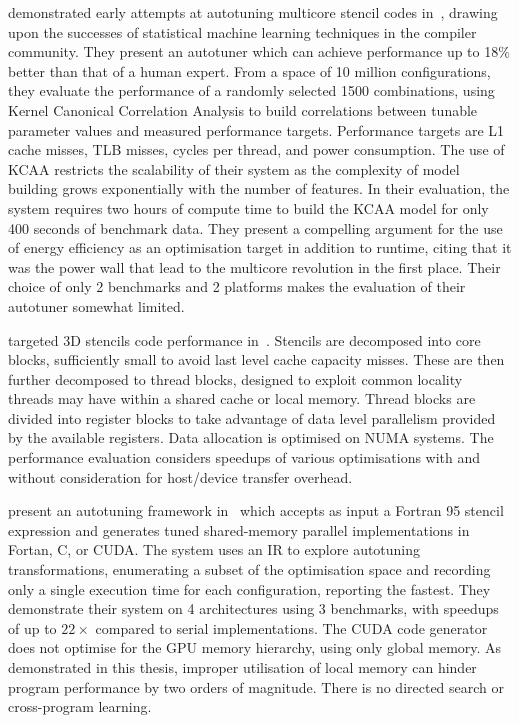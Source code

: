 \citeauthor{Ganapathi2009} demonstrated early attempts at autotuning multicore stencil codes in~\cite{Ganapathi2009}, drawing upon the successes of statistical machine learning techniques in the compiler community. They present an autotuner which can achieve performance up to 18\% better than that of a human expert. From a space of 10 million configurations, they evaluate the performance of a randomly selected 1500 combinations, using Kernel Canonical Correlation Analysis to build correlations between tunable parameter values and measured performance targets. Performance targets are L1 cache misses, TLB misses, cycles per thread, and power consumption. The use of KCAA restricts the scalability of their system as the complexity of model building grows exponentially with the number of features. In their evaluation, the system requires two hours of compute time to build the KCAA model for only 400 seconds of benchmark data. They present a compelling argument for the use of energy efficiency as an optimisation target in addition to runtime, citing that it was the power wall that lead to the multicore revolution in the first place. Their choice of only 2 benchmarks and 2 platforms makes the evaluation of their autotuner somewhat limited.

\citeauthor{Berkeley2009} targeted 3D stencils code performance in~\cite{Berkeley2009}. Stencils are decomposed into core blocks, sufficiently small to avoid last level cache capacity misses. These are then further decomposed to thread blocks, designed to exploit common locality threads may have within a shared cache or local memory. Thread blocks are divided into register blocks to take advantage of data level parallelism provided by the available registers. Data allocation is optimised on NUMA systems. The performance evaluation considers speedups of various optimisations with and without consideration for host/device transfer overhead.

\citeauthor{Kamil2010} present an autotuning framework in~\cite{Kamil2010} which accepts as input a Fortran 95 stencil expression and generates tuned shared-memory parallel implementations in Fortan, C, or CUDA. The system uses an IR to explore autotuning transformations, enumerating a subset of the optimisation space and recording only a single execution time for each configuration, reporting the fastest. They demonstrate their system on 4 architectures using 3 benchmarks, with speedups of up to $22\times$ compared to serial implementations. The CUDA code generator does not optimise for the GPU memory hierarchy, using only global memory. As demonstrated in this thesis, improper utilisation of local memory can hinder program performance by two orders of magnitude. There is no directed search or cross-program learning.

